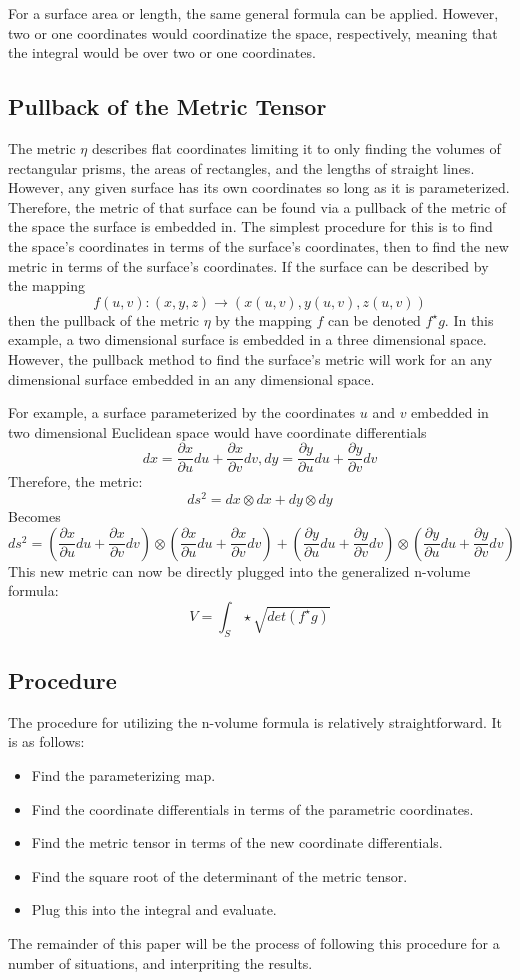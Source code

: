 \documentclass{article}
\begin{document}
For a surface area or length, the same general formula can be applied. However, two or one coordinates would coordinatize the space, respectively, meaning that the integral would be over two or one coordinates.

\subsection{Pullback of the Metric Tensor}
The metric $\eta$ describes flat coordinates limiting it to only finding the volumes of rectangular prisms, the areas of rectangles, and the lengths of straight lines. However, any given surface has its own coordinates so long as it is parameterized. Therefore, the metric of that surface can be found via a pullback of the metric of the space the surface is embedded in. The simplest procedure for this is to find the space's coordinates in terms of the surface's coordinates, then to find the new metric in terms of the surface's coordinates. If the surface can be described by the mapping
\[
f(u,v): (x,y,z) \rightarrow (x(u,v), y(u,v), z(u,v))
\]
then the pullback of the metric $\eta$ by the mapping $f$ can be denoted $f^{\star}g$. In this example, a two dimensional surface is embedded in a three dimensional space. However, the pullback method to find the surface's metric will work for an any dimensional surface embedded in an any dimensional space.

For example, a surface parameterized by the coordinates $u$ and $v$ embedded in two dimensional Euclidean space would have coordinate differentials
\[
dx = \frac{\partial x}{\partial u}du + \frac{\partial x}{\partial v} dv, dy = \frac{\partial y}{\partial u}du + \frac{\partial y}{\partial v} dv
\]
Therefore, the metric:
\[
ds^2 = dx \otimes dx + dy \otimes dy
\]
Becomes
\[
ds^2 = (\frac{\partial x}{\partial u}du + \frac{\partial x}{\partial v} dv) \otimes (\frac{\partial x}{\partial u}du + \frac{\partial x}{\partial v} dv) + (\frac{\partial y}{\partial u}du + \frac{\partial y}{\partial v} dv) \otimes (\frac{\partial y}{\partial u}du + \frac{\partial y}{\partial v} dv)
\]
This new metric can now be directly plugged into the generalized n-volume formula:
\[
V = \int_S \star \sqrt{det(f^{\star}g)}
\]
\subsection{Procedure}
The procedure for utilizing the n-volume formula is relatively straightforward. It is as follows:
\begin{itemize}
    \item Find the parameterizing map.
    \item Find the coordinate differentials in terms of the parametric coordinates.
    \item Find the metric tensor in terms of the new coordinate differentials.
    \item Find the square root of the determinant of the metric tensor.
    \item Plug this into the integral and evaluate.
\end{itemize}
The remainder of this paper will be the process of following this procedure for a number of situations, and interpriting the results.
\end{document}
